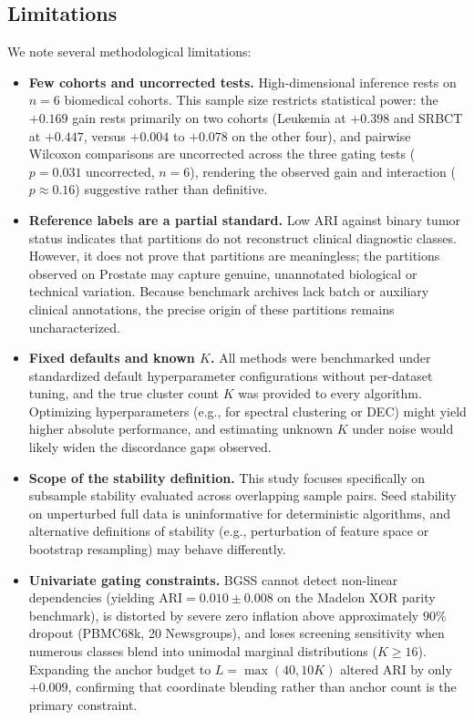 \documentclass[pdflatex,sn-mathphys-num]{sn-jnl}
\theoremstyle{thmstyleone}
\theoremstyle{thmstyletwo}
\theoremstyle{thmstylethree}
\begin{document}
\subsection{Limitations}\label{sec:limitations}\label{sec:limits_modes}
We note several methodological limitations:
\begin{itemize}
    \item \textbf{Few cohorts and uncorrected tests.} High-dimensional inference rests on $n = 6$ biomedical cohorts. This sample size restricts statistical power: the $+0.169$ gain rests primarily on two cohorts (Leukemia at $+0.398$ and SRBCT at $+0.447$, versus $+0.004$ to $+0.078$ on the other four), and pairwise Wilcoxon comparisons are uncorrected across the three gating tests ($p = 0.031$ uncorrected, $n=6$), rendering the observed gain and interaction ($p \approx 0.16$) suggestive rather than definitive.
\item \textbf{Reference labels are a partial standard.} Low ARI against binary tumor status indicates that partitions do not reconstruct clinical diagnostic classes. However, it does not prove that partitions are meaningless; the partitions observed on Prostate may capture genuine, unannotated biological or technical variation. Because benchmark archives lack batch or auxiliary clinical annotations, the precise origin of these partitions remains uncharacterized.
    \item \textbf{Fixed defaults and known $K$.} All methods were benchmarked under standardized default hyperparameter configurations without per-dataset tuning, and the true cluster count $K$ was provided to every algorithm. Optimizing hyperparameters (e.g., for spectral clustering or DEC) might yield higher absolute performance, and estimating unknown $K$ under noise would likely widen the discordance gaps observed.
    \item \textbf{Scope of the stability definition.} This study focuses specifically on subsample stability evaluated across overlapping sample pairs. Seed stability on unperturbed full data is uninformative for deterministic algorithms, and alternative definitions of stability (e.g., perturbation of feature space or bootstrap resampling) may behave differently.
    \item \textbf{Univariate gating constraints.} BGSS cannot detect non-linear dependencies (yielding $\text{ARI} = 0.010 \pm 0.008$ on the Madelon XOR parity benchmark), is distorted by severe zero inflation above approximately $90\%$ dropout (PBMC68k, 20 Newsgroups), and loses screening sensitivity when numerous classes blend into unimodal marginal distributions ($K \ge 16$). Expanding the anchor budget to $L = \max(40, 10K)$ altered ARI by only $+0.009$, confirming that coordinate blending rather than anchor count is the primary constraint.

\end{itemize}
\end{document}

